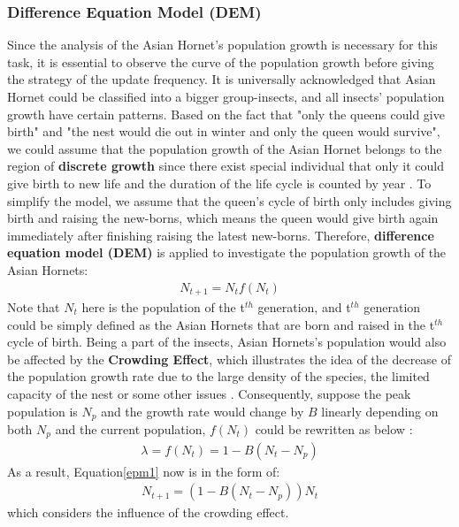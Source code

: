 \documentclass{mcmthesis}
\begin{document}
	\subsubsection{Difference Equation Model (DEM)}
	\quad Since the analysis of the Asian Hornet's population growth is necessary for this task, it is essential to observe the curve of the population growth before giving the strategy of the update frequency. It is universally acknowledged that Asian Hornet could be classified into a bigger group-insects, and all insects' population growth have certain patterns. Based on the fact that "only the queens could give birth" and "the nest would die out in winter and only the queen would survive", we could assume that the population growth of the Asian Hornet belongs to the region of \textbf{discrete growth} since there exist special individual that only it could give birth to new life and the duration of the life cycle is counted by year \cite{intro0}. To simplify the model, we assume that the queen's cycle of birth only includes giving birth and raising the new-borns, which means the queen would give birth again immediately after finishing raising the latest new-borns. Therefore, \textbf{difference equation model (DEM)} is applied to investigate the population growth of the Asian Hornets:
	\begin{align}
		N_{t+1} = N_{t}f(N_t)
		\label{epm1}
	\end{align}
	 Note that $N_t$ here is the population of the t$^{th}$ generation, and t$^{th}$ generation could be simply defined as the Asian Hornets that are born and raised in the t$^{th}$ cycle of birth. Being a part of the insects, Asian Hornets's population would also be affected by the \textbf{Crowding Effect}, which illustrates the idea of the decrease of the population growth rate due to the large density of the species, the limited capacity of the nest or some other issues \cite{reproduction}. Consequently, suppose the peak population is $N_p$ and the growth rate would change by $B$ linearly depending on both $N_p$ and the current population, $f(N_t)$ could be rewritten as below \cite{reproduction}:
	 \begin{align*}
	 		\lambda = f(N_t) = 1-B(N_t-N_p)
	 \end{align*}
 	As a result, Equation\ref{epm1} now is in the form of:
 	\begin{align}
 		N_{t+1} = (1-B(N_t-N_p))N_{t}
 		\label{epm2}
 	\end{align}
 	which considers the influence of the crowding effect.
\end{document}

